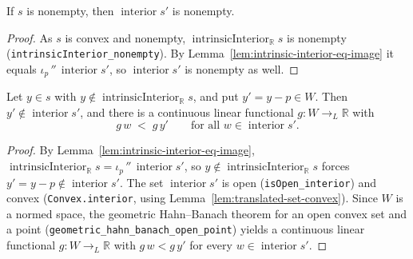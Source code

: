 \begin{lemma}
    \label{lem:intrinsic-interior-nonempty}
    \leanok
    If $s$ is nonempty, then $\operatorname{interior} s'$ is nonempty.
\end{lemma}
\begin{proof}
    As $s$ is convex and nonempty, $\operatorname{intrinsicInterior}_{\mathbb R} s$
    is nonempty (\texttt{intrinsicInterior\_nonempty}). By
    Lemma~\ref{lem:intrinsic-interior-eq-image} it equals
    $\iota_p\,''\,\operatorname{interior} s'$, so $\operatorname{interior} s'$ is
    nonempty as well.
\end{proof}

\begin{lemma}
    \label{lem:separation-in-direction}
    \leanok
    Let $y \in s$ with $y \notin \operatorname{intrinsicInterior}_{\mathbb R} s$,
    and put $y' = y - p \in W$. Then $y' \notin \operatorname{interior} s'$, and
    there is a continuous linear functional $g : W \to_{L} \mathbb R$ with
    \[
        g\,w \;<\; g\,y' \qquad \text{for all } w \in \operatorname{interior} s' .
    \]
\end{lemma}
\begin{proof}
    By Lemma~\ref{lem:intrinsic-interior-eq-image},
    $\operatorname{intrinsicInterior}_{\mathbb R} s
      = \iota_p\,''\,\operatorname{interior} s'$, so
    $y \notin \operatorname{intrinsicInterior}_{\mathbb R} s$ forces
    $y' = y - p \notin \operatorname{interior} s'$. The set
    $\operatorname{interior} s'$ is open (\texttt{isOpen\_interior}) and convex
    (\texttt{Convex.interior}, using Lemma~\ref{lem:translated-set-convex}). Since
    $W$ is a normed space, the geometric Hahn--Banach theorem for an open convex
    set and a point (\texttt{geometric\_hahn\_banach\_open\_point}) yields a
    continuous linear functional $g : W \to_L \mathbb R$ with $g\,w < g\,y'$ for
    every $w \in \operatorname{interior} s'$.
\end{proof}

